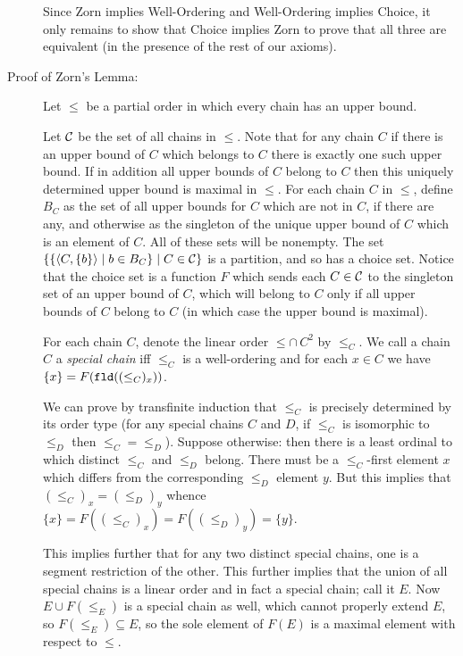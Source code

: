 \documentclass[12pt]{book}
\begin{document}
\begin{description}
Since Zorn implies Well-Ordering and Well-Ordering implies Choice, it
only remains to show that Choice implies Zorn to prove that all three
are equivalent (in the presence of the rest of our axioms).

\item[Proof of Zorn's Lemma:] Let $\leq$ be a partial order in which every
chain has an upper bound.

Let $\cal C$ be the set of all chains in $\leq$.  Note that for any
chain $C$ if there is an upper bound of $C$ which belongs to $C$ there
is exactly one such upper bound.  If in addition all upper bounds of
$C$ belong to $C$ then this uniquely determined upper bound is maximal
in $\leq$.  For each chain $C$ in $\leq$, define $B_C$ as the set of
all upper bounds for $C$ which are not in $C$, if there are any, and
otherwise as the singleton of the unique upper bound of $C$ which is
an element of $C$.  All of these sets will be nonempty.  The set $\{\{\left<C,\{b\}\right> \mid b \in B_C\}\mid C \in {\cal C}\}$ is a partition, and so has a choice set.  Notice that the
choice set is a function $F$ which sends each $C \in {\cal C}$ to the
singleton set of an upper bound of $C$, which will belong to $C$ only
if all upper bounds of $C$ belong to $C$ (in which case the upper
bound is maximal).

For each chain $C$, denote the linear order $\leq\cap\, C^2$ by
$\leq_C$.  We call a chain $C$ a {\em special chain\/} iff $\leq_C$ is
a well-ordering and for each $x\in C$ we have $\{x\} = F({\tt
fld}((\leq_C)_x))$.

We can prove by transfinite induction that $\leq_C$ is precisely
determined by its order type (for any special chains $C$ and $D$, if
$\leq_C$ is isomorphic to $\leq_D$ then $\leq_C=\leq_D$).  Suppose
otherwise: then there is a least ordinal to which distinct $\leq_C$
and $\leq_D$ belong.  There must be a $\leq_C$-first element $x$ which
differs from the corresponding $\leq_D$ element $y$.  But this implies
that $(\leq_C)_x = (\leq_D)_y$ whence $\{x\} = F((\leq_C)_x) =
F((\leq_D)_y)=\{y\}$.

This implies further that for any two distinct special chains, one is
a segment restriction of the other.  This further implies that the
union of all special chains is a linear order and in fact a special
chain; call it $E$.  Now $E \cup F(\leq_E)$ is a special chain as
well, which cannot properly extend $E$, so $F(\leq_E)\subseteq E$, so
the sole element of $F(E)$ is a maximal element with respect to
$\leq$.


\end{description}
\end{document}
